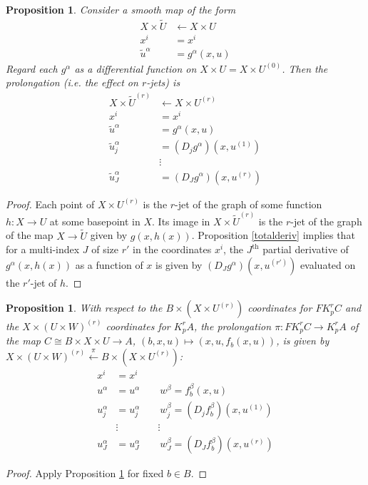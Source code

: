 \documentclass[12pt]{article}
\numberwithin{equation}{section}
\theoremstyle{plain}
\newtheorem{proposition}[definition]{Proposition}
\theoremstyle{definition}
\newcommand{\la}{\leftarrow}
\newcommand{\ra}{\rightarrow}
\begin{document}
\begin{proposition}\label{prolongco} Consider a smooth map of the form
\begin{align*}
X\times \tilde{U}&\la X\times U\\
x^{i}&= x^{i}\\
\tilde{u}^{\alpha}&=g^{\alpha}(x,u) 
\end{align*}
Regard each $g^{\alpha}$ as a differential function on $X\times U=X\times U^{(0)}$. Then the prolongation (i.e. the effect on $r$-jets) is
\begin{align*}
X\times \tilde{U}^{(r)}&\la X\times U^{(r)}\\
x^{i}&= x^{i}\\
\tilde{u}^{\alpha}&=g^{\alpha}(x,u) \\
\tilde{u}^{\alpha}_{j}&=(D_{j}g^{\alpha})(x,u^{(1)})\\
&\vdots\\
\tilde{u}^{\alpha}_{J}&=(D_{J}g^{\alpha})(x,u^{(r)})
\end{align*}
\end{proposition}
\begin{proof} Each point of $X\times U^{(r)}$ is the $r$-jet of the graph of some function $h:X\ra U$ at some basepoint in $X$. Its image in $X\times \tilde{U}^{(r)}$ is the $r$-jet of the graph of the map $X\ra \tilde{U}$ given by $g(x,h(x))$. Proposition \ref{totalderiv} implies that for a multi-index $J$ of size $r'$ in the coordinates $x^{i}$, the $J^{\text{th}}$ partial derivative of $g^{\alpha}(x,h(x))$ as a function of $x$ is given by $(D_{J}g^{\alpha})(x,u^{(r')})$ evaluated on the $r'$-jet of $h$.
\end{proof}

\begin{proposition}\label{prolongfam} With respect to the $B\times (X\times U^{(r)})$ coordinates for $FK^{r}_{p}C$ and the $X\times(U\times W)^{(r)}$ coordinates for $K^{r}_{p}A$, the prolongation $\pi:FK^{r}_{p}C\ra K^{r}_{p}A$ of the map $C\cong B\times X\times U \ra A$, $(b,x,u)\mapsto (x,u,f_b(x,u))$, is given by $X\times(U\times W)^{(r)} \overset{\pi}{\la} B\times (X\times U^{(r)})$:
\begin{align*}
x^{i}&=x^{i} \\
u^{\alpha}&=u^{\alpha}\qquad w^{\beta}=f^{\beta}_{b}(x,u)\\
u^{\alpha}_{j}&=u^{\alpha}_{j}\qquad  w^{\beta}_{j}=(D_{j}f^{\beta}_{b})(x,u^{(1)})\\
&\vdots\qquad\qquad \vdots\\
u^{\alpha}_{J}&=u^{\alpha}_{J}\qquad  w^{\beta}_{J}=(D_{J}f^{\beta}_{b})(x,u^{(r)})
\end{align*}
\end{proposition}
\begin{proof} Apply Proposition \ref{prolongco} for fixed $b\in B$.
\end{proof}
\end{document}
